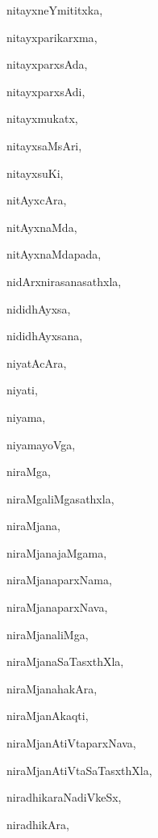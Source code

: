 \begin{multicols}{2}
{nitayxneYmititxka}, \pageref{nitayxneYmititxka}

{nitayxparikarxma}, \pageref{nitayxparikarxma}

{nitayxparxsAda}, \pageref{nitayxparxsAda}

{nitayxparxsAdi}, \pageref{nitayxparxsAdi}

{nitayxmukatx}, \pageref{nitayxmukatx}

{nitayxsaMsAri}, \pageref{nitayxsaMsAri}

{nitayxsuKi}, \pageref{nitayxsuKi}

{nitAyxcAra}, \pageref{nitAyxcAra}

{nitAyxnaMda}, \pageref{nitAyxnaMda}

{nitAyxnaMdapada}, \pageref{nitAyxnaMdapada}

{nidArxnirasanasathxla}, \pageref{nidArxnirasanasathxla}

{nididhAyxsa}, \pageref{nididhAyxsa}

{nididhAyxsana}, \pageref{nididhAyxsana}

{niyatAcAra}, \pageref{niyatAcAra}

{niyati}, \pageref{niyati}

{niyama}, \pageref{niyama}

{niyamayoVga}, \pageref{niyamayoVga}

{niraMga}, \pageref{niraMga}

{niraMgaliMgasathxla}, \pageref{niraMgaliMgasathxla}

{niraMjana}, \pageref{niraMjana}

{niraMjanajaMgama}, \pageref{niraMjanajaMgama}

{niraMjanaparxNama}, \pageref{niraMjanaparxNama}

{niraMjanaparxNava}, \pageref{niraMjanaparxNava}

{niraMjanaliMga}, \pageref{niraMjanaliMga}

{niraMjanaSaTasxthXla}, \pageref{niraMjanaSaTasxthXla}

{niraMjanahakAra}, \pageref{niraMjanahakAra}

{niraMjanAkaqti}, \pageref{niraMjanAkaqti}

{niraMjanAtiVtaparxNava}, \pageref{niraMjanAtiVtaparxNava}

{niraMjanAtiVtaSaTasxthXla}, \pageref{niraMjanAtiVtaSaTasxthXla}

{niradhikaraNadiVkeSx}, \pageref{niradhikaraNadiVkeSx}

{niradhikAra}, \pageref{niradhikAra}


\end{multicols}
